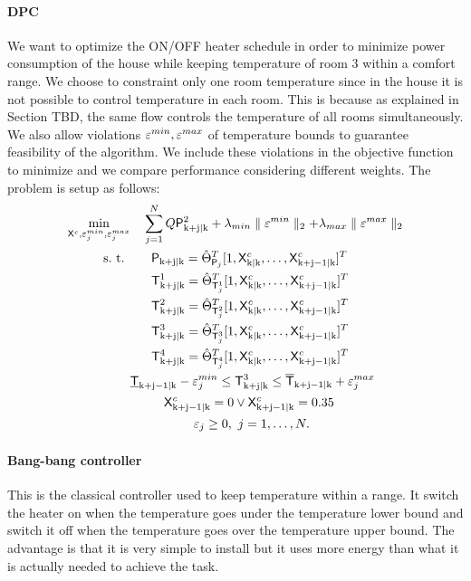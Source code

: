 \paragraph{DPC}
We want to optimize the ON/OFF heater schedule in order to minimize power consumption of the house while keeping temperature of room $3$ within a comfort range. We choose to constraint only one room temperature since in the house it is not possible to control temperature in each room. This is because as explained in Section TBD, the same flow controls the temperature of all rooms simultaneously. We also allow violations $\varepsilon^{min},\varepsilon^{max}$  of temperature bounds to guarantee feasibility of the algorithm. We include these violations in the objective function to minimize and we compare performance considering different weights. The problem is setup as follows:
\begin{align}
	\begin{aligned}
		\min_{\tX^c,\eps_j^{min},\eps_j^{max}} & \ \ \ \sum_{j=1}^{N} Q{\tP}_{\mathrm{k+j|k}}^2 +  \lambda_{min}\parallel\eps^{min}\parallel_2 + \lambda_{max}\parallel\eps^{max}\parallel_2 \\
		\text{s.~t. }& \ \ \ \ \ {\tP}_{\mathrm{k+j|k}} =  \hat{\Theta}^{T}_{\tP_j} [ 1,\tX^c_{\mathrm{k|k}},\dots,\tX^c_{\mathrm{k+j-1|k}} ]^T \\
					 & \ \ \ \ \ \tT^1_{\mathrm{k+j|k}} =  \hat{\Theta}^{T}_{\tT^1_j} [ 1,\tX^c_{\mathrm{k|k}},\dots,\tX^c_{\mathrm{k+j-1|k}} ]^T \\
					 & \ \ \ \ \ \tT^2_{\mathrm{k+j|k}} =  \hat{\Theta}^{T}_{\tT^2_j} [ 1,\tX^c_{\mathrm{k|k}},\dots,\tX^c_{\mathrm{k+j-1|k}} ]^T \\
			 	 	 & \ \ \ \ \ \tT^3_{\mathrm{k+j|k}} =  \hat{\Theta}^{T}_{\tT^3_j} [ 1,\tX^c_{\mathrm{k|k}},\dots,\tX^c_{\mathrm{k+j-1|k}} ]^T \\
				 	 & \ \ \ \ \ \tT^4_{\mathrm{k+j|k}} =  \hat{\Theta}^{T}_{\tT^4_j} [ 1,\tX^c_{\mathrm{k|k}},\dots,\tX^c_{\mathrm{k+j-1|k}} ]^T \\					
					 & \underline{\tT}_{\mathrm{k+j-1|k}}-\eps^{min}_j \leq \tT^3_{\mathrm{k+j|k}} \leq \overline{\tT}_{\mathrm{k+j-1|k}} + \eps^{max}_j\\
					 & \ \ \ \ \ \ \ \ \tX^c_{\mathrm{k+j-1|k}} = 0 \lor \tX^c_{\mathrm{k+j-1|k}} = 0.35\\ 
					 & \ \ \ \ \ \ \ \ \ \ \ \ \ \ \ \eps_j \geq 0, \ j = 1,\dots,N.
	\end{aligned}
	\label{E:DPCrealcase}
\end{align}
\paragraph{Bang-bang controller}
This is the classical controller used to keep temperature within a range. It switch the heater on when the temperature goes under the temperature lower bound and switch it off when the temperature goes over the temperature upper bound. The advantage is that it is very simple to install but it uses more energy than what it is actually needed to achieve the task.
